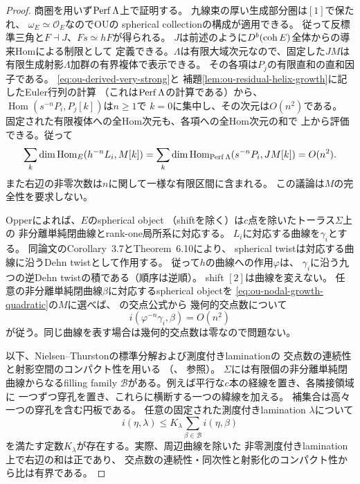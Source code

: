 \begin{proof}
商圏を用いず$\operatorname{Perf}\Lambda$上で証明する。
九線束の厚い生成部分圏は$[1]$で保たれ、
$\omega_E\simeq\mathcal O_E$なのでOU\cite[(3)--(5)]{OUSpherical2020}の
spherical collectionの構成が適用できる。
従って反標準三角と$F\dashv J$、$Fs\simeq hF$が得られる。
$J$は前述のように$D^b(\operatorname{coh} E)$全体からの導来Homによる制限として
定義できる。$\Lambda$は有限大域次元なので、固定した$JM$は
有限生成射影$\Lambda$加群の有界複体で表示できる。
その各項は$P_j$の有限直和の直和因子である。
\eqref{eq:ou-derived-very-strong}と
補題\ref{lem:ou-residual-helix-growth}に記したEuler行列の計算
（これは$\operatorname{Perf}\Lambda$の計算である）から、
$\operatorname{Hom}(s^{-n}P_i,P_j[k])$は$n\geq1$で
$k=0$に集中し、その次元は$O(n^2)$である。
固定された有限複体への全Hom次元も、各項への全Hom次元の和で
上から評価できる。従って
\begin{equation}
 \label{eq:ou-nodal-growth-quadratic}
 \sum_k\dim\operatorname{Hom}_E(h^{-n}L_i,M[k])
 =\sum_k\dim\operatorname{Hom}_{\operatorname{Perf}\Lambda}(s^{-n}P_i,JM[k])
 =O(n^2).
\end{equation}
また右辺の非零次数は$n$に関して一様な有限区間に含まれる。
この議論は$M$の完全性を要求しない。

Opper\cite[Theorem~7.1]{Opper2026}によれば、$E$のspherical object
（shiftを除く）は$c$点を除いたトーラス$\Sigma$上の
非分離単純閉曲線とrank-one局所系に対応する。
$L_i$に対応する曲線を$\gamma_i$とする。
同論文のCorollary~3.7とTheorem~6.10により、
spherical twistは対応する曲線に沿うDehn twistとして作用する。
従って$h$の曲線への作用$\varphi$は、
$\gamma_i$に沿う九つの逆Dehn twistの積である（順序は逆順）。
shift $[2]$は曲線を変えない。
任意の非分離単純閉曲線$\beta$に対応するspherical objectを
\eqref{eq:ou-nodal-growth-quadratic}の$M$に選べば、
\cite[Proposition~4.10, Corollary~4.11]{Opper2026}の交点公式から
幾何的交点数について
\begin{equation}
 \label{eq:ou-nodal-growth-intersection}
 i(\varphi^{-n}\gamma_i,\beta)=O(n^2)
\end{equation}
が従う。同じ曲線を表す場合は幾何的交点数は零なので問題ない。

以下、Nielsen--Thurstonの標準分解および測度付きlaminationの
交点数の連続性と射影空間のコンパクト性を用いる
（\cite[Chapters~13,15]{FarbMargalit2012}、
\cite[Chapters~5,6,9]{FLP2012}参照）。
$\Sigma$には有限個の非分離単純閉曲線からなるfilling family
$\mathcal B$がある。例えば平行な$c$本の経線を置き、各隣接領域に
一つずつ穿孔を置き、これらに横断する一つの緯線を加える。
補集合は高々一つの穿孔を含む円板である。
任意の固定された測度付きlamination $\lambda$について
\[
 i(\eta,\lambda)\leq K_\lambda\sum_{\beta\in\mathcal B}i(\eta,\beta)
\]
を満たす定数$K_\lambda$が存在する。実際、周辺曲線を除いた
非零測度付きlamination上で右辺の和は正であり、
交点数の連続性・同次性と射影化のコンパクト性から比は有界である。


\end{proof}
